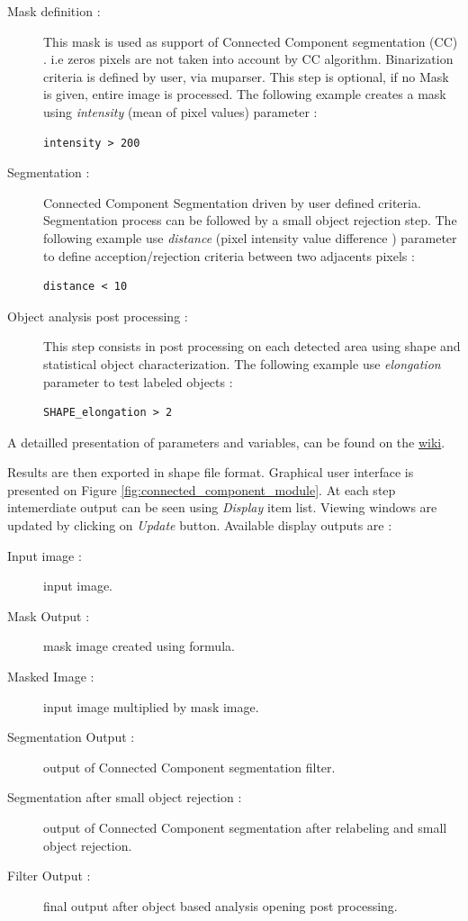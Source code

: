 \begin{description}
\item[Mask definition :] This mask is used as support of Connected Component segmentation (CC) . i.e zeros pixels are not taken into account by CC algorithm. Binarization criteria is defined by user, via muparser. This step is optional, if no Mask is given, entire image is processed. The following example creates a mask using \emph{intensity} (mean of pixel values) parameter :

\begin{verbatim}
intensity > 200
\end{verbatim}
  
\item[Segmentation :] Connected Component Segmentation driven by user defined criteria. Segmentation process can be followed by a small object rejection step. The following example use \emph{distance} (pixel intensity value difference ) parameter to define acception/rejection criteria between two adjacents pixels :

\begin{verbatim}
distance < 10
\end{verbatim}
  
\item[Object analysis post processing :] This step consists in post processing on each detected area using shape and statistical object characterization. The following example use \emph{elongation} parameter to test labeled objects :

\begin{verbatim}
SHAPE_elongation > 2
\end{verbatim}
 
\end{description}

 A detailled presentation of parameters and variables, can be found on the \href{http://wiki.orfeo-toolbox.org/index.php/Connected_component_segmentation_module}{wiki}. 

Results are then exported in shape file format. Graphical user interface is presented on Figure \ref{fig:connected_component_module}. At each step intemerdiate output can be seen using \emph{Display} item list. Viewing windows are updated by clicking on \emph{Update} button. Available display outputs are :

\begin{description}
\item[Input image :] input image.
\item[Mask Output :] mask image created using formula.
\item[Masked Image :] input image multiplied by mask image.
\item[Segmentation Output :] output of Connected Component segmentation filter.
\item[Segmentation after small object rejection :] output of Connected Component segmentation after relabeling and small object rejection.
\item[Filter Output :] final output after object based analysis opening post processing. 
\end{description}

